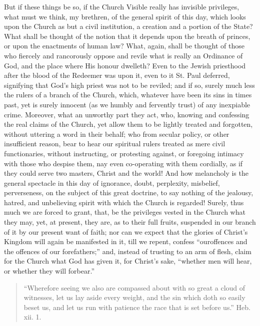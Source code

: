 But if these things be so, if the Church Visible really has
invisible privileges, what must we think, my brethren, of the general
spirit of this day, which looks upon the Church as but a civil
institution, a creation and a portion of the State? What shall be
thought of the notion that it depends upon the breath of princes, or
upon the enactments of human law? What, again, shall be thought of
those who fiercely and rancorously oppose and revile what is really an
Ordinance of God, and the place where His honour dwelleth? Even to the
Jewish priesthood after the blood of the Redeemer was upon it, even to
it St. Paul deferred, signifying that God's high priest was not to be
reviled; and if so, surely much less the rulers of a branch of the
Church, which, whatever have been its sins in times past, yet is
surely innocent (as we humbly and fervently trust) of any inexpiable
crime. Moreover, what an unworthy part they act, who, knowing and
confessing the real claims of the Church, yet allow them to be lightly
treated and forgotten, without uttering a word in their behalf; who
from secular policy, or other insufficient reason, bear to hear our
spiritual rulers treated as mere civil functionaries, without
instructing, or protesting against, or foregoing intimacy with those
who despise them, nay even co-operating with them cordially, as if they
could serve two masters, Christ and the world! And how melancholy is
the general spectacle in this day of ignorance, doubt, perplexity,
misbelief, perverseness, on the subject of this great doctrine, to say
nothing of the jealousy, hatred, and unbelieving spirit with which the
Church is regarded! Surely, thus much we are forced to grant, that, be
the privileges vested in the Church what they may, yet, at present,
they are, as to their full fruits, suspended in our branch of it by
our present want of faith; nor can we expect that the glories of
Christ's Kingdom will again be manifested in it, till we repent,
confess ``our\emph{}offences and the offences of our
forefathers;'' and, instead of trusting to an arm of flesh, claim
for the Church what God has given it, for Christ's sake, ``whether
men will hear, or whether they will forbear.''


\begin{quote}

``Wherefore seeing we also are compassed about with so great
a cloud of witnesses, let us lay aside every weight, and the sin
which doth so easily beset us, and let us run with patience the race
that is set before us.'' Heb. xii. 1.

\end{quote}

